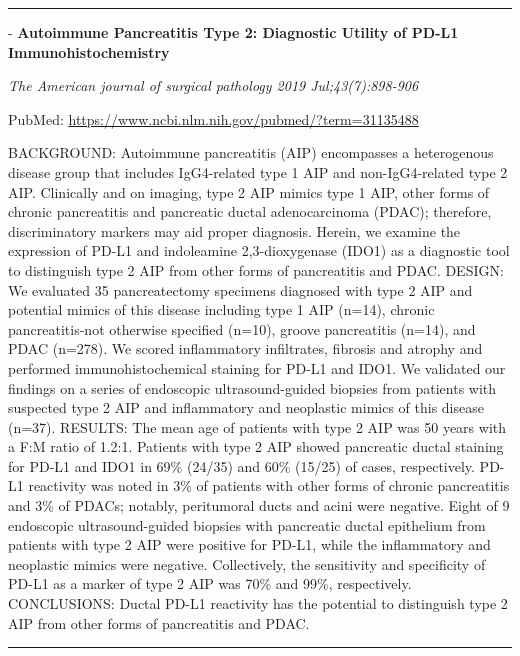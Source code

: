\documentclass[]{article}
\begin{document}
\begin{center}\rule{0.5\linewidth}{\linethickness}\end{center}

 - \textbf{Autoimmune Pancreatitis Type 2: Diagnostic Utility of PD-L1
Immunohistochemistry}

\emph{The American journal of surgical pathology 2019 Jul;43(7):898-906}

PubMed: \url{https://www.ncbi.nlm.nih.gov/pubmed/?term=31135488}

BACKGROUND: Autoimmune pancreatitis (AIP) encompasses a heterogenous
disease group that includes IgG4-related type 1 AIP and non-IgG4-related
type 2 AIP. Clinically and on imaging, type 2 AIP mimics type 1 AIP,
other forms of chronic pancreatitis and pancreatic ductal adenocarcinoma
(PDAC); therefore, discriminatory markers may aid proper diagnosis.
Herein, we examine the expression of PD-L1 and indoleamine
2,3-dioxygenase (IDO1) as a diagnostic tool to distinguish type 2 AIP
from other forms of pancreatitis and PDAC. DESIGN: We evaluated 35
pancreatectomy specimens diagnosed with type 2 AIP and potential mimics
of this disease including type 1 AIP (n=14), chronic pancreatitis-not
otherwise specified (n=10), groove pancreatitis (n=14), and PDAC
(n=278). We scored inflammatory infiltrates, fibrosis and atrophy and
performed immunohistochemical staining for PD-L1 and IDO1. We validated
our findings on a series of endoscopic ultrasound-guided biopsies from
patients with suspected type 2 AIP and inflammatory and neoplastic
mimics of this disease (n=37). RESULTS: The mean age of patients with
type 2 AIP was 50 years with a F:M ratio of 1.2:1. Patients with type 2
AIP showed pancreatic ductal staining for PD-L1 and IDO1 in 69\% (24/35)
and 60\% (15/25) of cases, respectively. PD-L1 reactivity was noted in
3\% of patients with other forms of chronic pancreatitis and 3\% of
PDACs; notably, peritumoral ducts and acini were negative. Eight of 9
endoscopic ultrasound-guided biopsies with pancreatic ductal epithelium
from patients with type 2 AIP were positive for PD-L1, while the
inflammatory and neoplastic mimics were negative. Collectively, the
sensitivity and specificity of PD-L1 as a marker of type 2 AIP was 70\%
and 99\%, respectively. CONCLUSIONS: Ductal PD-L1 reactivity has the
potential to distinguish type 2 AIP from other forms of pancreatitis and
PDAC.

{}

{}

\begin{center}\rule{0.5\linewidth}{\linethickness}\end{center}
\end{document}
